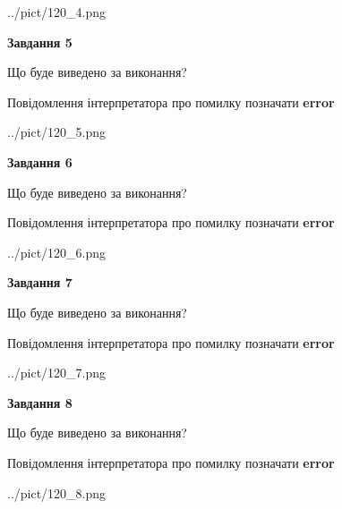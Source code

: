 \documentclass[12pt, ukrainian]{article}
\begin{document}
{\begin{center}
	{../pict/120_4.png}
\end{center}
\newpage

{\begin {center}\textbf{Завдання 5}\end {center}}\par
Що буде виведено за виконання? \par
Повідомлення інтерпретатора про помилку позначати \textbf{error}

\begin{center}
	{../pict/120_5.png}
\end{center}
\newpage

{\begin {center}\textbf{Завдання 6}\end {center}}\par
Що буде виведено за виконання? \par
Повідомлення інтерпретатора про помилку позначати \textbf{error}

\begin{center}
	{../pict/120_6.png}
\end{center}
\newpage

{\begin {center}\textbf{Завдання 7}\end {center}}\par
Що буде виведено за виконання? \par
Повідомлення інтерпретатора про помилку позначати \textbf{error}

\begin{center}
	{../pict/120_7.png}
\end{center}
\newpage

{\begin {center}\textbf{Завдання 8}\end {center}}\par
Що буде виведено за виконання? \par
Повідомлення інтерпретатора про помилку позначати \textbf{error}

\begin{center}
	{../pict/120_8.png}
\end{center}
\newpage

}
\end{document}
